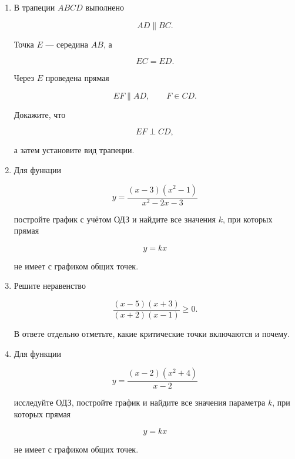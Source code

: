 \documentclass[a4paper,12pt]{article}
\begin{document}
\begin{enumerate}[label=\textbf{\arabic*.}]
    Точка

    \[
    N\in CD,
    \]

    причём

    \[
    CN=9,
    \qquad
    ND=21.
    \]

    Через $N$ проведена прямая

    \[
    KN\parallel AD,
    \qquad
    K\in AB.
    \]

    Найдите $KN$.

    \item
    В трапеции $ABCD$ выполнено

    \[
    AD\parallel BC.
    \]

    Точка $E$ --- середина $AB$,
    а

    \[
    EC=ED.
    \]

    Через $E$ проведена прямая

    \[
    EF\parallel AD,
    \qquad
    F\in CD.
    \]

    Докажите, что

    \[
    EF\perp CD,
    \]

    а затем установите вид трапеции.

    \item
    Для функции

    \[
    y=
    \frac{(x-3)(x^2-1)}
         {x^2-2x-3}
    \]

    постройте график с учётом ОДЗ
    и найдите все значения $k$,
    при которых прямая

    \[
    y=kx
    \]

    не имеет с графиком общих точек.

    \item
    Решите неравенство

    \[
    \frac{(x-5)(x+3)}
         {(x+2)(x-1)}
    \ge0.
    \]

    В ответе отдельно отметьте,
    какие критические точки включаются
    и почему.

    \item
    Для функции

    \[
    y=
    \frac{(x-2)(x^2+4)}
         {x-2}
    \]

    исследуйте ОДЗ,
    постройте график
    и найдите все значения параметра $k$,
    при которых прямая

    \[
    y=kx
    \]

    не имеет с графиком общих точек.

\end{enumerate}
\end{document}
